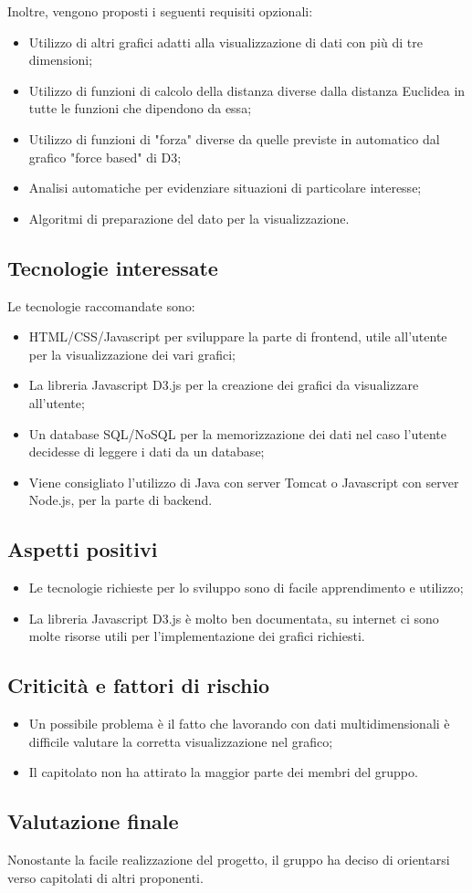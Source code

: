 Inoltre, vengono proposti i seguenti requisiti opzionali:
\begin{itemize}
\item Utilizzo di altri grafici adatti alla visualizzazione di dati con più di tre dimensioni;
\item Utilizzo di funzioni di calcolo della distanza diverse dalla distanza Euclidea in tutte le funzioni che dipendono da essa;
\item Utilizzo di funzioni di "forza" diverse da quelle previste in automatico dal grafico "force based" di D3;
\item Analisi automatiche per evidenziare situazioni di particolare interesse;
\item Algoritmi di preparazione del dato per la visualizzazione.
\end{itemize}

\subsection{Tecnologie interessate}
Le tecnologie raccomandate sono:
\begin{itemize}
\item HTML/CSS/Javascript per sviluppare la parte di frontend, utile all'utente per la visualizzazione dei vari grafici;
\item La libreria Javascript D3.js per la creazione dei grafici da visualizzare all'utente;
\item Un database SQL/NoSQL per la memorizzazione dei dati nel caso l'utente decidesse di leggere i dati da un database;
\item Viene consigliato l’utilizzo di Java con server Tomcat o Javascript con server Node.js, per la parte di backend.
\end{itemize}

\subsection{Aspetti positivi}
\begin{itemize}
\item Le tecnologie richieste per lo sviluppo sono di facile apprendimento e utilizzo;
\item La libreria Javascript D3.js è molto ben documentata, su internet ci sono molte risorse utili per l'implementazione dei grafici richiesti.
\end{itemize}

\subsection{Criticità e fattori di rischio}
\begin{itemize}
\item Un possibile problema è il fatto che lavorando con dati multidimensionali è difficile valutare la corretta visualizzazione nel grafico;
\item Il capitolato non ha attirato la maggior parte dei membri del gruppo.
\end{itemize}

\subsection{Valutazione finale}
Nonostante la facile realizzazione del progetto, il gruppo ha deciso di orientarsi verso capitolati di altri proponenti.
